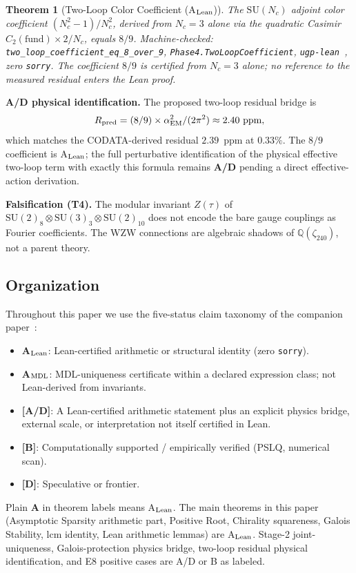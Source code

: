 \documentclass[11pt]{article}
\newtheorem{theorem}{Theorem}[section]
\theoremstyle{remark}
\newcommand{\zetaN}[1]{\zeta_{#1}}
\begin{document}
\begin{theorem}[Two-Loop Color Coefficient (A$_{\rm Lean}$)]
The $\mathrm{SU}(N_c)$ adjoint color coefficient $(N_c^2-1)/N_c^2$, derived from $N_c=3$ alone via the quadratic Casimir $C_2(\mathrm{fund}) \times 2/N_c$, equals $8/9$.
\medskip\noindent
\textit{Machine-checked: \texttt{two\_loop\_coefficient\_eq\_8\_over\_9},
\texttt{Phase4.TwoLoopCoefficient}, \texttt{ugp-lean}~\cite{ugp-lean}, zero \texttt{sorry}.
The coefficient $8/9$ is certified from $N_c=3$ alone; no reference to the measured residual enters the Lean proof.}
\end{theorem}

\noindent\textbf{A/D physical identification.}
The proposed two-loop residual bridge is
\[
  R_{\rm pred} = (8/9)\times\alpha_{\rm EM}^2/(2\pi^2) \approx 2.40~\text{ppm},
\]
which matches the CODATA-derived residual $2.39$~ppm at $0.33\%$.
The $8/9$ coefficient is A$_{\rm Lean}$; the full perturbative identification of the physical effective two-loop term with exactly this formula remains \textbf{A/D} pending a direct effective-action derivation.

\noindent\textbf{Falsification (T4).}
The modular invariant $Z(\tau)$ of $\mathrm{SU}(2)_8 \otimes \mathrm{SU}(3)_3
\otimes \mathrm{SU}(2)_{10}$ does not encode the bare gauge couplings as Fourier
coefficients.  The WZW connections are algebraic shadows of $\mathbb{Q}(\zetaN{240})$,
not a parent theory.

\subsection{Organization}
\label{subsec:organization}

Throughout this paper we use the five-status claim taxonomy of the companion paper~\cite{Spivack2026_SM_UGP}:
\begin{itemize}[leftmargin=1.5em,itemsep=0pt]
  \item \textbf{A$_{\rm Lean}$}: Lean-certified arithmetic or structural identity (zero \texttt{sorry}).
  \item \textbf{A$_{\rm MDL}$}: MDL-uniqueness certificate within a declared expression class; not Lean-derived from invariants.
  \item \textbf{[A/D]}: A Lean-certified arithmetic statement plus an explicit physics bridge, external scale, or interpretation not itself certified in Lean.
  \item \textbf{[B]}: Computationally supported / empirically verified (PSLQ, numerical scan).
  \item \textbf{[D]}: Speculative or frontier.
\end{itemize}
Plain \textbf{A} in theorem labels means A$_{\rm Lean}$.  The main theorems in this paper (Asymptotic Sparsity arithmetic part, Positive Root, Chirality squareness, Galois Stability, lcm identity, Lean arithmetic lemmas) are A$_{\rm Lean}$.  Stage-2 joint-uniqueness, Galois-protection physics bridge, two-loop residual physical identification, and E8 positive cases are A/D or B as labeled.
\end{document}
